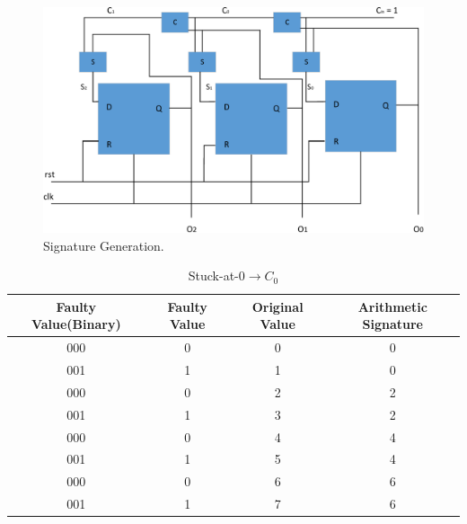 \begin{figure}[tb!]
 \centering
  \captionsetup{justification=centering}    
   \includegraphics[scale=0.6]{Figures/counter.pdf}
   \caption{Signature Generation.}
\label{fig:counter}
\end{figure}
\begin{table}[tb!]
\center
\caption{Stuck-at-0$\rightarrow C_0$}
\label{c@0-c0}
\begin{tabular}{|c | c| c | c| } 
 \hline
 \rowcolor{lightgray}
Faulty Value(Binary) & Faulty Value & Original Value & Arithmetic Signature   \\ 
\hline
 
 
 000& 0 &0 & 0  \\
 \hline
 001 & 1 & 1 & 0 \\ 
 \hline
 
 000 & 0 & 2 & 2 \\
 \hline
 001& 1& 3& 2 \\
 \hline
 000 & 0  &  4& 4 \\
 \hline
 001 & 1 & 5 &4  \\
 \hline
 000 & 0 & 6 & 6 \\
 \hline
 001 & 1 & 7 & 6 \\
 \hline
 
 
\end{tabular}
\end{table}
